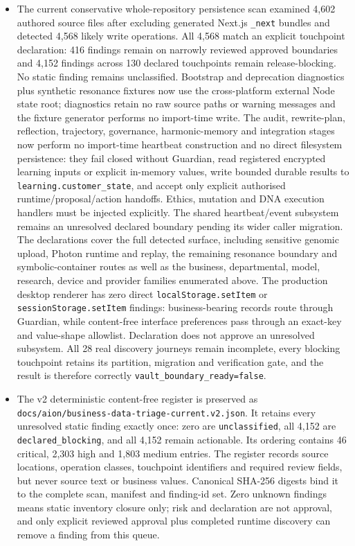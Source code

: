 \documentclass[11pt]{article}
\newcommand{\code}[1]{\texttt{#1}}
\begin{document}
\begin{itemize}
  \item The current conservative whole-repository persistence scan examined 4,602 authored source files after excluding generated Next.js \code{\_next} bundles and detected 4,568 likely write operations. All 4,568 match an explicit touchpoint declaration: 416 findings remain on narrowly reviewed approved boundaries and 4,152 findings across 130 declared touchpoints remain release-blocking. No static finding remains unclassified. Bootstrap and deprecation diagnostics plus synthetic resonance fixtures now use the cross-platform external Node state root; diagnostics retain no raw source paths or warning messages and the fixture generator performs no import-time write. The audit, rewrite-plan, reflection, trajectory, governance, harmonic-memory and integration stages now perform no import-time heartbeat construction and no direct filesystem persistence: they fail closed without Guardian, read registered encrypted learning inputs or explicit in-memory values, write bounded durable results to \code{learning.customer\_state}, and accept only explicit authorised runtime/proposal/action handoffs. Ethics, mutation and DNA execution handlers must be injected explicitly. The shared heartbeat/event subsystem remains an unresolved declared boundary pending its wider caller migration. The declarations cover the full detected surface, including sensitive genomic upload, Photon runtime and replay, the remaining resonance boundary and symbolic-container routes as well as the business, departmental, model, research, device and provider families enumerated above. The production desktop renderer has zero direct \texttt{localStorage.setItem} or \texttt{sessionStorage.setItem} findings: business-bearing records route through Guardian, while content-free interface preferences pass through an exact-key and value-shape allowlist. Declaration does not approve an unresolved subsystem. All 28 real discovery journeys remain incomplete, every blocking touchpoint retains its partition, migration and verification gate, and the result is therefore correctly \code{vault\_boundary\_ready=false}.
  \item The v2 deterministic content-free register is preserved as \code{docs/aion/business-data-triage-current.v2.json}. It retains every unresolved static finding exactly once: zero are \code{unclassified}, all 4,152 are \code{declared\_blocking}, and all 4,152 remain actionable. Its ordering contains 46 critical, 2,303 high and 1,803 medium entries. The register records source locations, operation classes, touchpoint identifiers and required review fields, but never source text or business values. Canonical SHA-256 digests bind it to the complete scan, manifest and finding-id set. Zero unknown findings means static inventory closure only; risk and declaration are not approval, and only explicit reviewed approval plus completed runtime discovery can remove a finding from this queue.

\end{itemize}
\end{document}
